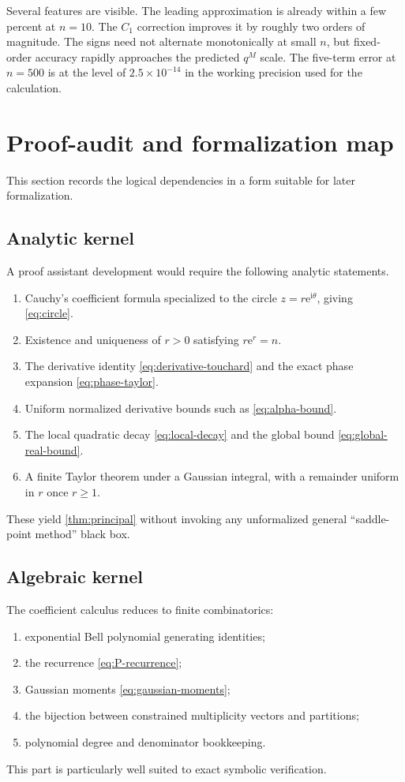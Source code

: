\documentclass[11pt,a4paper]{article}
\theoremstyle{definition}
\newcommand{\ee}{\mathrm e}
\newcommand{\ii}{\mathrm i}
\begin{document}
Several features are visible.  The leading approximation is already within a
few percent at $n=10$.  The $C_1$ correction improves it by roughly two orders
of magnitude.  The signs need not alternate monotonically at small $n$, but
fixed-order accuracy rapidly approaches the predicted $q^M$ scale.  The
five-term error at $n=500$ is at the level of $2.5\times10^{-14}$ in the
working precision used for the calculation.

\section{Proof-audit and formalization map}

This section records the logical dependencies in a form suitable for later
formalization.

\subsection{Analytic kernel}

A proof assistant development would require the following analytic statements.
\begin{enumerate}
 \item Cauchy's coefficient formula specialized to the circle
       $z=r\ee^{\ii\theta}$, giving \eqref{eq:circle}.
 \item Existence and uniqueness of $r>0$ satisfying $r\ee^r=n$.
 \item The derivative identity \eqref{eq:derivative-touchard} and the exact
       phase expansion \eqref{eq:phase-taylor}.
 \item Uniform normalized derivative bounds such as
       \eqref{eq:alpha-bound}.
 \item The local quadratic decay \eqref{eq:local-decay} and the global bound
       \eqref{eq:global-real-bound}.
 \item A finite Taylor theorem under a Gaussian integral, with a remainder
       uniform in $r$ once $r\ge1$.
\end{enumerate}
These yield \cref{thm:principal} without invoking any unformalized general
``saddle-point method'' black box.

\subsection{Algebraic kernel}

The coefficient calculus reduces to finite combinatorics:
\begin{enumerate}
 \item exponential Bell polynomial generating identities;
 \item the recurrence \eqref{eq:P-recurrence};
 \item Gaussian moments \eqref{eq:gaussian-moments};
 \item the bijection between constrained multiplicity vectors and partitions;
 \item polynomial degree and denominator bookkeeping.
\end{enumerate}
This part is particularly well suited to exact symbolic verification.
\end{document}
